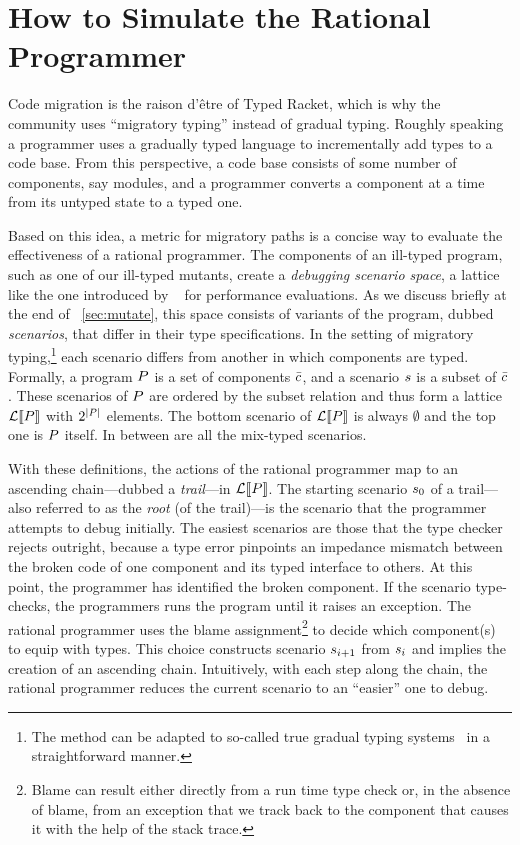 \section{How to Simulate the Rational Programmer} 

Code migration is the raison d'\^etre of Typed Racket, which is why the community
uses ``migratory typing'' instead of gradual typing. Roughly speaking a
programmer uses a gradually typed language to incrementally add types to a code
base. From this perspective, a code base consists of some number of components,
say modules, and a programmer converts a component at a time from its untyped
state to a typed one. 

Based on this idea, a metric for migratory paths is a concise way to
evaluate the effectiveness of a rational programmer. The components of
an ill-typed program, such as one of  our ill-typed mutants, 
create a \emph{debugging scenario space}, a lattice like
the one introduced by ~\citet{tfgnvf-popl-2016} for performance
evaluations. As we discuss briefly at the end of ~\ref{sec:mutate}, 
this space consists of variants of the program, dubbed
\emph{scenarios}, that differ in their type specifications. In the
setting of migratory typing,\footnote{The method can be adapted to
so-called true gradual typing systems~\cite{svcb-snapl-2015} in a
straightforward manner.} each scenario differs from another in which
components are typed. Formally, a program $P$ is a set of
components $\bar{c}$, and a scenario $s$ is a subset of
$\bar{c}$ . These scenarios of $P$ are ordered by the
subset relation and thus form a lattice $\mathcal{L}\llbracket P\rrbracket$ with
$2^{\mid P \mid}$ elements.  The bottom scenario of
$\mathcal{L}\llbracket P\rrbracket$ is always $\emptyset$ and the top one is $P$
itself. In between are all the mix-typed scenarios.

With these definitions, the actions of the rational programmer map to
an ascending chain---dubbed a \emph{trail}---in $\mathcal{L}\llbracket P\rrbracket$.
The starting scenario $s_0$ of a trail---also referred to as the
\emph{root} (of the trail)---is the scenario that the programmer
attempts to debug initially. The easiest scenarios are those that the
type checker rejects outright, because a type error pinpoints an
impedance mismatch between the broken code of one component and its
typed interface to others. At this point, the programmer has
identified the broken component. If the scenario type-checks, the
programmers runs the program until it raises an exception.  The
rational programmer uses the blame assignment\footnote{Blame can
result either directly from a run time type check or, in the absence
of blame, from an exception that we track back to the component that
causes it with the help of the stack trace.} to decide which
component(s) to equip with types. This choice constructs scenario
$s_{i+1}$ from $s_{i}$ and implies the creation of an
ascending chain.  Intuitively, with each step along the chain, the
rational programmer reduces the current scenario to an ``easier'' one
to debug.

